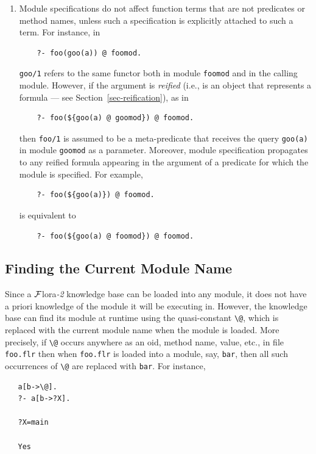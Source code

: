 \documentclass[11pt]{article}
\makeatletter
\newcommand{\FLORA}{{\mbox{\sc ${\cal F}${lora}\rm\emph{-2}}}\xspace}
\newcommand{\FLSYSTEM}{\FLORA}
\newcommand{\flrext}{flr\xspace}
\newcommand{\thismodule}{{\tt \bs{}@}\xspace}
\newcommand{\bs}{\textbackslash}
\makeatother
\begin{document}
\begin{enumerate}
\item Module specifications do not affect function terms that are not
  predicates or method names, unless such a specification is explicitly
  attached to such a term. For instance, in
  \begin{verbatim}
    ?- foo(goo(a)) @ foomod.
  \end{verbatim}
  {\tt goo/1} refers to the same functor both in module {\tt foomod} and in
  the calling module. However, if the argument is \emph{reified} (i.e., is
  an object that represents a formula --- see
  Section~\ref{sec-reification}), as in
  \begin{verbatim}
    ?- foo(${goo(a) @ goomod}) @ foomod.
  \end{verbatim}
  then {\tt foo/1} is assumed to be a meta-predicate that receives the
  query {\tt goo(a)} in module {\tt goomod} as a parameter. Moreover,
  module specification propagates to any reified formula appearing in
  the argument of a predicate for which the module is specified. For example,
  \begin{verbatim}
    ?- foo(${goo(a)}) @ foomod.
  \end{verbatim}
is equivalent to
  \begin{verbatim}
    ?- foo(${goo(a) @ foomod}) @ foomod.
  \end{verbatim}

\end{enumerate}


\subsection{Finding the Current Module Name}\label{sec-currmod}

\index{module!\thismodule}
\index{\thismodule}
%
Since a \FLSYSTEM knowledge base can be loaded into any module, it does not
have a priori knowledge of the module it will be executing in. However, the
knowledge base can find its module at runtime using the quasi-constant
\thismodule, which is replaced with the current module name when the module
is loaded. More precisely, if \thismodule occurs anywhere as an oid, method
name, value, etc., in file {\tt foo.\flrext} then when {\tt foo.\flrext} is loaded
into a module, say, {\tt bar}, then all such occurrences of \thismodule are
replaced with {\tt bar}. For instance,
\begin{verbatim}
   a[b->\@].
   ?- a[b->?X].

   ?X=main

   Yes
\end{verbatim}
\end{document}
